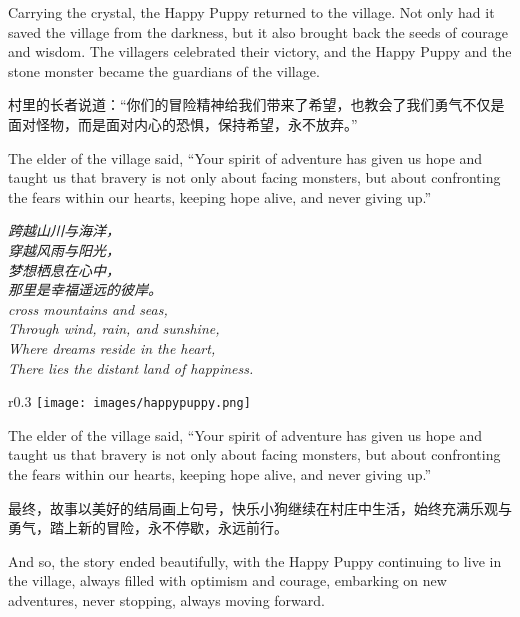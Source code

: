 \begin{flushright}
Carrying the crystal, the Happy Puppy returned to the village. Not only had it saved the village from the darkness, but it also brought back the seeds of courage and wisdom. The villagers celebrated their victory, and the Happy Puppy and the stone monster became the guardians of the village.
\end{flushright}

村里的长者说道：“你们的冒险精神给我们带来了希望，也教会了我们勇气不仅是面对怪物，而是面对内心的恐惧，保持希望，永不放弃。”

\begin{flushright}
The elder of the village said, “Your spirit of adventure has given us hope and taught us that bravery is not only about facing monsters, but about confronting the fears within our hearts, keeping hope alive, and never giving up.”
\end{flushright}

\begin{center}
\textit{
跨越山川与海洋，\\
穿越风雨与阳光，\\
梦想栖息在心中，\\
那里是幸福遥远的彼岸。 \\
cross mountains and seas,\\
Through wind, rain, and sunshine,\\
Where dreams reside in the heart,\\
There lies the distant land of happiness.
}
\end{center}

\begin{wrapfigure}{r}{0.3\textwidth}  %
    \texttt{[image: images/happypuppy.png]} %
\end{wrapfigure}

\begin{flushright}
The elder of the village said, “Your spirit of adventure has given us hope and taught us that bravery is not only about facing monsters, but about confronting the fears within our hearts, keeping hope alive, and never giving up.”
\end{flushright}

最终，故事以美好的结局画上句号，快乐小狗继续在村庄中生活，始终充满乐观与勇气，踏上新的冒险，永不停歇，永远前行。

\begin{flushright}
And so, the story ended beautifully, with the Happy Puppy continuing to live in the village, always filled with optimism and courage, embarking on new adventures, never stopping, always moving forward.
\end{flushright}
